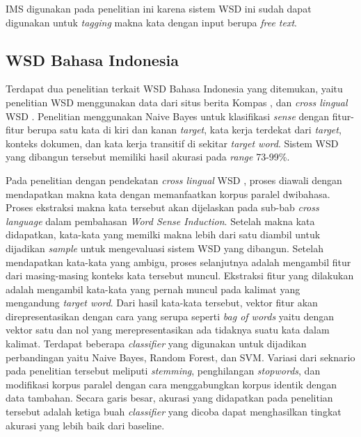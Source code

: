 IMS digunakan pada penelitian ini karena sistem WSD ini sudah dapat digunakan untuk \textit{tagging} makna kata dengan input berupa \textit{free text}.

\subsection{WSD Bahasa Indonesia}

Terdapat dua penelitian terkait WSD Bahasa Indonesia yang ditemukan, yaitu penelitian WSD menggunakan data dari situs berita Kompas \citep{uliniansyah2006word}, dan \textit{cross lingual} WSD \citep{septiantri2013wsd}. Penelitian \citep{uliniansyah2006word} menggunakan Naive Bayes untuk klasifikasi \textit{sense} dengan fitur-fitur berupa satu kata di kiri dan kanan \textit{target}, kata kerja terdekat dari \textit{target}, konteks dokumen, dan kata kerja transitif di sekitar \textit{target word}. Sistem WSD yang dibangun tersebut memiliki hasil akurasi pada \textit{range} 73-99\%.

Pada penelitian dengan pendekatan \textit{cross lingual} WSD \citep{septiantri2013wsd}, proses diawali dengan mendapatkan makna kata dengan memanfaatkan korpus paralel dwibahasa. Proses ekstraksi makna kata tersebut akan dijelaskan pada sub-bab \textit{cross language} dalam pembahasan \textit{Word Sense Induction}. Setelah makna kata didapatkan, kata-kata yang memilki makna lebih dari satu diambil untuk dijadikan \textit{sample} untuk mengevaluasi sistem WSD yang dibangun. Setelah mendapatkan kata-kata yang ambigu, proses selanjutnya adalah mengambil fitur dari masing-masing konteks kata tersebut muncul. Ekstraksi fitur yang dilakukan adalah mengambil kata-kata yang pernah muncul pada kalimat yang mengandung \textit{target word}. Dari hasil kata-kata tersebut, vektor fitur akan direpresentasikan dengan cara yang serupa seperti \textit{bag of words} yaitu dengan vektor satu dan nol yang merepresentasikan ada tidaknya suatu kata dalam kalimat. Terdapat beberapa \textit{classifier} yang digunakan untuk dijadikan perbandingan yaitu Naive Bayes, Random Forest, dan SVM. Variasi dari seknario pada penelitian tersebut meliputi \textit{stemming}, penghilangan \textit{stopwords}, dan modifikasi korpus paralel dengan cara menggabungkan korpus identik dengan data tambahan. Secara garis besar, akurasi yang didapatkan pada penelitian tersebut adalah ketiga buah \textit{classifier} yang dicoba dapat menghasilkan tingkat akurasi yang lebih baik dari baseline.

